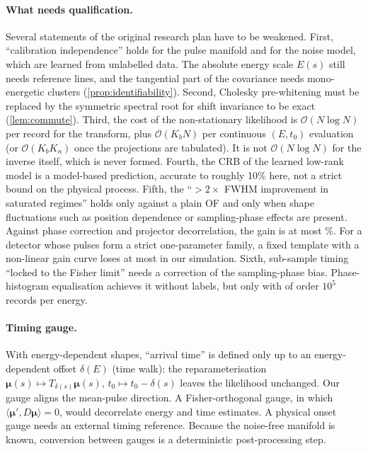 \documentclass[aps,prapplied,reprint,superscriptaddress,longbibliography,nofootinbib]{revtex4-2}
\theoremstyle{remark}
\newcommand{\vect}[1]{\bm{#1}}
\newcommand{\Sh}[1]{T_{#1}}
\begin{document}
\paragraph{What needs qualification.} Several statements of the original research
plan have to be weakened. First, ``calibration independence'' holds for the pulse
manifold and for the noise model, which are learned from unlabelled data. The
absolute energy scale $E(s)$ still needs reference lines, and the tangential part
of the covariance needs mono-energetic clusters (\cref{prop:identifiability}).
Second, Cholesky pre-whitening must be replaced by the symmetric spectral root for
shift invariance to be exact (\cref{lem:commute}). Third, the cost of the
non-stationary likelihood is $\mathcal O(N\log N)$ per record for the transform,
plus $\mathcal O(K_bN)$ per continuous $(E,t_0)$ evaluation (or
$\mathcal O(K_b K_n)$ once the projections are tabulated). It is not
$\mathcal O(N\log N)$ for the inverse itself, which is never formed. Fourth, the CRB of the learned low-rank model is a model-based prediction, accurate
to roughly 10\% here, not a strict bound on the physical process. Fifth, the ``$>2\times$ FWHM improvement in saturated regimes''
holds only against a plain OF and only when shape fluctuations such as position
dependence or sampling-phase effects are present. Against phase correction and
projector decorrelation, the gain is at most \impBestTopMorph\%. For a detector whose
pulses form a strict one-parameter family, a fixed template with a non-linear gain
curve loses at most \gainMaxNoMorph{} in our simulation. Sixth, sub-sample timing ``locked to the Fisher
limit'' needs a correction of the sampling-phase bias. Phase-histogram
equalisation achieves it without labels, but only with of order $10^5$ records per
energy.

\paragraph{Timing gauge.} With energy-dependent shapes, ``arrival time'' is defined
only up to an energy-dependent offset $\delta(E)$ (time walk): the reparameterisation
$\vect\mu(s)\mapsto\Sh{\delta(s)}\vect\mu(s)$, $t_0\mapsto t_0-\delta(s)$ leaves the
likelihood unchanged. Our gauge aligns the mean-pulse direction. A Fisher-orthogonal
gauge, in which $\langle\vect\mu',D\vect\mu\rangle=0$, would decorrelate energy and
time estimates. A physical onset gauge needs an external timing reference. Because
the noise-free manifold is known, conversion between gauges is a deterministic
post-processing step.
\end{document}
